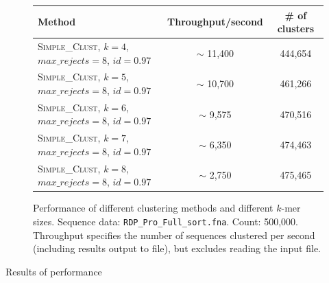 \begin{figure}[H]
  \centering
  \begin{tabular}{ p{12em} | c | c }
    Method  & Throughput/second   & \# of clusters \\
    \hline \hline
    \textsc{Simple\_Clust}, $k=4$,
    $max\_rejects=8$, $id=0.97$     & $\sim$ 11,400  & 444,654  \\
    \hline
    \textsc{Simple\_Clust}, $k=5$,
    $max\_rejects=8$, $id=0.97$     & $\sim$ 10,700  & 461,266  \\
    \hline
    \textsc{Simple\_Clust}, $k=6$,
    $max\_rejects=8$, $id=0.97$     & $\sim$ 9,575   & 470,516  \\
    \hline
    \textsc{Simple\_Clust}, $k=7$,
    $max\_rejects=8$, $id=0.97$     & $\sim$ 6,350   & 474,463  \\
    \hline
    \textsc{Simple\_Clust}, $k=8$,
    $max\_rejects=8$, $id=0.97$     & $\sim$ 2,750   & 475,465  \\
  \end{tabular}
  \caption{Performance of different clustering methods and different $k$-mer
  sizes. Sequence data:
           \texttt{RDP\_Pro\_Full\_sort.fna}. Count: 500,000. Throughput
           specifies the number of sequences clustered per second (including
           results output to file), but excludes reading the input file.}
\end{figure}

Results of performance

